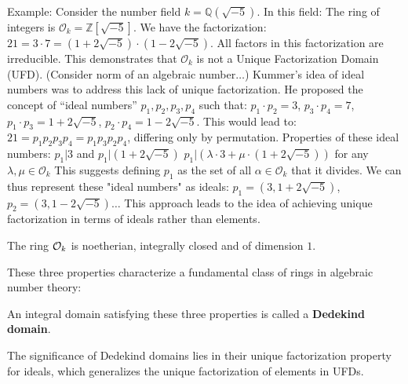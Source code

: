 \begin{outline}
    \1 Example: Consider the number field $k = \mathbb{Q}(\sqrt{-5})$. In this field:
        \2 The ring of integers is $\mathcal{O}_k = \mathbb{Z}[\sqrt{-5}]$.
        \2 We have the factorization: $21 = 3 \cdot 7 = (1+2\sqrt{-5}) \cdot (1-2\sqrt{-5})$. All factors in this factorization are irreducible. This demonstrates that $\mathcal{O}_k$ is not a Unique Factorization Domain (UFD). (Consider norm of an algebraic number$\ldots$)
        \2 Kummer's idea of ideal numbers was to address this lack of unique factorization. He proposed the concept of \enquote{ideal numbers} $p_1, p_2, p_3, p_4$ such that:
            $p_1 \cdot p_2 = 3$,
            $p_3 \cdot p_4 = 7$,
            $p_1 \cdot p_3 = 1 + 2\sqrt{-5}$,
            $p_2 \cdot p_4 = 1 - 2\sqrt{-5}$.
        This would lead to: $21 = p_1p_2p_3p_4 = p_1p_3p_2p_4$, differing only by permutation.
        \2 Properties of these ideal numbers:
            \3 $p_1 | 3$ and $p_1 | (1+2\sqrt{-5})$
            \3 $p_1 | (\lambda \cdot 3 + \mu \cdot (1+2\sqrt{-5}))$ for any $\lambda, \mu \in \mathcal{O}_k$
        \2 This suggests defining $p_1$ as the set of all $\alpha \in \mathcal{O}_k$ that it divides.
        We can thus represent these "ideal numbers" as ideals:
            $p_1 = (3, 1+2\sqrt{-5})$,
            $p_2 = (3, 1-2\sqrt{-5})\ldots$
    \1[] This approach leads to the idea of achieving unique factorization in terms of ideals rather than elements.
\0 \begin{theorem}
    The ring $\mathcal{O}_k$ is noetherian, integrally closed and of dimension $1$.
\end{theorem}

These three properties characterize a fundamental class of rings in algebraic number theory:

\begin{definition}
An integral domain satisfying these three properties is called a \textbf{Dedekind domain}. 
\end{definition}
\end{outline}

The significance of Dedekind domains lies in their unique factorization property for ideals, which generalizes the unique factorization of elements in UFDs.


